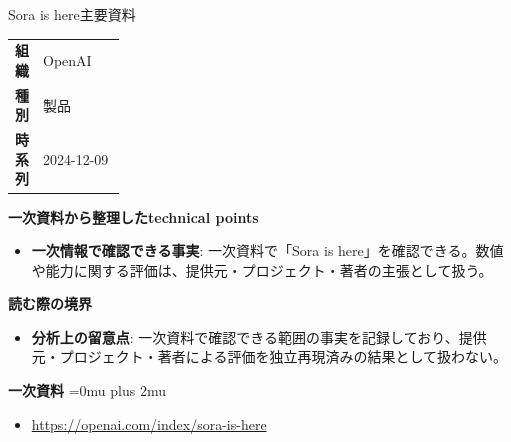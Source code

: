 \begin{technicalnote}{Sora is here}{主要資料}
\begingroup
\begin{tabularx}{\linewidth}{@{}>{\bfseries}p{0.22\linewidth}X@{}}
組織 & OpenAI \\
種別 & 製品 \\
時系列 & 2024-12-09 \\
\end{tabularx}
\smallskip
{\bfseries 一次資料から整理したtechnical points}
\begin{itemize}[leftmargin=1.5em,itemsep=0.35em]
\item \textbf{一次情報で確認できる事実}: 一次資料で「Sora is here」を確認できる。数値や能力に関する評価は、提供元・プロジェクト・著者の主張として扱う。
\end{itemize}
\begin{minipage}{\linewidth}
{\bfseries 読む際の境界}
\begin{itemize}[leftmargin=1.5em,itemsep=0.35em]
\item \textbf{分析上の留意点}: 一次資料で確認できる範囲の事実を記録しており、提供元・プロジェクト・著者による評価を独立再現済みの結果として扱わない。
\end{itemize}
\begin{samepage}
{\bfseries 一次資料}
\begingroup\sloppy
\Urlmuskip=0mu plus 2mu\relax
\begin{itemize}[leftmargin=1.5em,itemsep=0.25em]
\item {\scriptsize\url{https://openai.com/index/sora-is-here}}
\end{itemize}
\endgroup
\end{samepage}
\end{minipage}
\endgroup
\end{technicalnote}
\medskip

